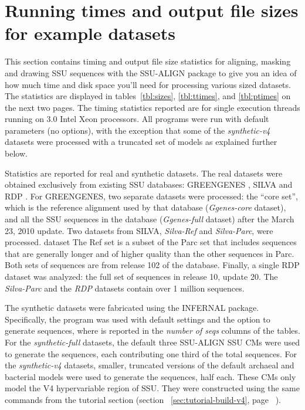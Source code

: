 \section{Running times and output file sizes for example datasets}
\label{sec:stats}

This section contains timing and output file size statistics for
aligning, masking and drawing SSU sequences with the SSU-ALIGN
package to give you an idea of how much time and disk space you'll
need for processing various sized datasets.  The statistics are
displayed in tables~\ref{tbl:sizes}, \ref{tbl:ttimes}, and
\ref{tbl:ptimes} on the next two pages. The timing statistics reported
are for single execution threads running on 3.0 Intel Xeon
processors. All programs were run with default parameters (no
options), with the exception that some of the \emph{synthetic-v4} datasets
were processed with a truncated set of models as explained further
below.

%

Statistics are reported for real and synthetic datasets. The real
datasets were obtained exclusively from existing SSU databases:
GREENGENES \cite{DeSantis06a}, SILVA
\cite{Pruesse07} and RDP \cite{Cole09}. For GREENGENES,
two separate datasets were processed: the ``core set'', which is the
reference alignment used by that database (\emph{Ggenes-core}
dataset), and all the SSU sequences in the database
(\emph{Ggenes-full} dataset) after the March 23, 2010 update. Two
datasets from SILVA, \emph{Silva-Ref} and \emph{Silva-Parc}, were
processed. dataset The Ref set is a subset of the Parc
set that includes sequences that are generally longer and of higher
quality than the other sequences in Parc. Both sets of sequences are
from release 102 of the database. Finally, a single RDP dataset
was analyzed: the full set of sequences in release 10, update 20. The
\emph{Silva-Parc} and the \emph{RDP} datasets contain over 1 million
sequences.

The synthetic datasets were fabricated using the INFERNAL
package. Specifically, the  program was used with default
settings and the  option to generate 
sequences, where  is reported in the \emph{number of seqs}
columns of the tables. For the \emph{synthetic-full} datasets, the
default three SSU-ALIGN SSU CMs were used to generate the
sequences, each contributing one third of the total sequences. For the
\emph{synthetic-v4} datasets, smaller, truncated versions of the default
archaeal and bacterial models were used to generate the sequences,
half each. These CMs only model the V4 hypervariable region of
SSU. They were constructed using the same  commands
from the tutorial section (section
~\ref{sec:tutorial-build-v4}, page ~\pageref{sec:tutorial-build-v4}).

